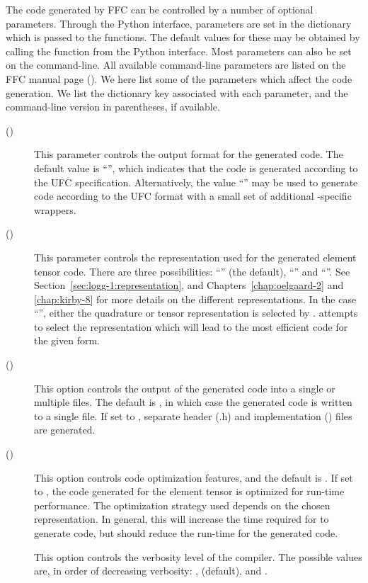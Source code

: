 The code generated by FFC can be controlled by a number of optional
parameters. Through the Python interface, parameters are set in the
dictionary  which is passed to the 
functions.  The default values for these may be obtained by calling
the function  from the Python interface. Most
parameters can also be set on the command-line.  All available
command-line parameters are listed on the FFC manual page (). We here list some of the parameters which affect the code
generation. We list the dictionary key associated with each parameter,
and the command-line version in parentheses, if available.
%
\begin{description}
  \item[ ()]
    This parameter controls the output format for the generated
    code. The default value is ``'', which indicates that the
    code is generated according to the UFC
    specification. Alternatively, the value ``'' may be
    used to generate code according to the UFC format with a small set
    of additional \dolfin{}-specific wrappers.
   \item[ ()] This parameter controls the representation used for the
    generated element tensor code. There are three possibilities:
    ``'' (the default), ``'' and
    ``''. See Section~\ref{sec:logg-1:representation}, and
    Chapters~\ref{chap:oelgaard-2} and \ref{chap:kirby-8} for more
    details on the different representations. In the case
    ``'', either the quadrature or tensor representation is
    selected by \ffc{}. \ffc{} attempts to select the representation
    which will lead to the most efficient code for the given form.
  \item[ ()] This option controls the output of the
    generated code into a single or multiple files. The default is
    , in which case the generated code is written to a single
    file. If set to , separate header (.h) and implementation
    () files are generated.
  \item[ ()] This option controls code optimization features,
    and the default is . If set to , the code
    generated for the element tensor is optimized for run-time performance.
    The optimization strategy used depends on
    the chosen representation. In general, this will increase the
    time required for \ffc{} to generate code, but should reduce the run-time
    for the generated code.
  \item[] This option controls the verbosity level of the
    compiler. The possible values are, in order of decreasing
    verbosity: ,  (default),  and .
\end{description}

